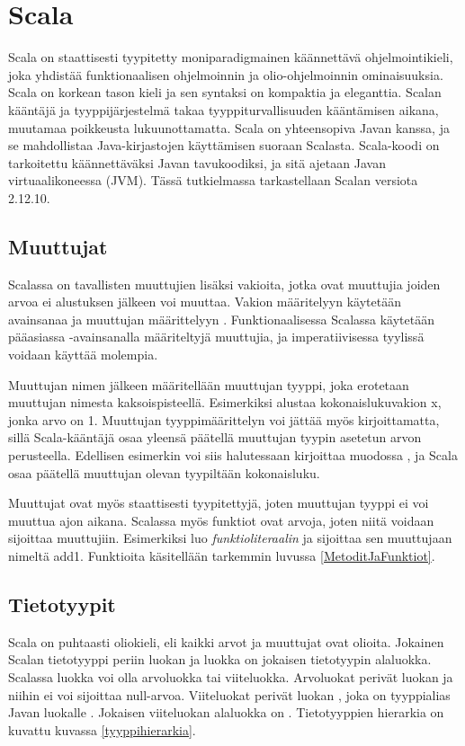 \chapter{Scala} \label{Scala}
Scala on staattisesti tyypitetty moniparadigmainen käännettävä ohjelmointikieli, joka yhdistää funktionaalisen ohjelmoinnin ja olio-ohjelmoinnin ominaisuuksia. Scala on korkean tason kieli ja sen syntaksi on kompaktia ja eleganttia. Scalan kääntäjä ja tyyppijärjestelmä takaa tyyppiturvallisuuden kääntämisen aikana, muutamaa poikkeusta lukuunottamatta. Scala on yhteensopiva Javan kanssa, ja se mahdollistaa Java-kirjastojen käyttämisen suoraan Scalasta. Scala-koodi on tarkoitettu käännettäväksi Javan tavukoodiksi, ja sitä ajetaan Javan virtuaalikoneessa (JVM). Tässä tutkielmassa tarkastellaan Scalan versiota 2.12.10.
\cite[Introduction]{tourOfScala}
\cite[Luku 2]{prorgrammingInScala3rd}


\section{Muuttujat} \label{Muuttujat}
Scalassa on tavallisten muuttujien lisäksi vakioita, jotka ovat muuttujia joiden arvoa ei alustuksen jälkeen voi muuttaa. Vakion määritelyyn käytetään avainsanaa  ja muuttujan määrittelyyn . Funktionaalisessa Scalassa käytetään pääasiassa -avainsanalla määriteltyjä muuttujia, ja imperatiivisessa tyylissä voidaan käyttää molempia.

Muuttujan nimen jälkeen määritellään muuttujan tyyppi, joka erotetaan muuttujan nimesta kaksoispisteellä. Esimerkiksi  alustaa kokonaislukuvakion x, jonka arvo on 1. Muuttujan tyyppimäärittelyn voi jättää myös kirjoittamatta, sillä Scala-kääntäjä osaa yleensä päätellä muuttujan tyypin asetetun arvon perusteella. Edellisen esimerkin voi siis halutessaan kirjoittaa muodossa , ja Scala osaa päätellä muuttujan olevan tyypiltään kokonaisluku.
\cite[Basics]{tourOfScala}

Muuttujat ovat myös staattisesti tyypitettyjä, joten muuttujan tyyppi ei voi muuttua ajon aikana. Scalassa myös funktiot ovat arvoja, joten niitä voidaan sijoittaa muuttujiin. Esimerkiksi  luo \textit{funktioliteraalin} ja sijoittaa sen muuttujaan nimeltä add1. Funktioita käsitellään tarkemmin luvussa \ref{MetoditJaFunktiot}.
\cite[Luku 1]{prorgrammingInScala3rd}


\section{Tietotyypit}
Scala on puhtaasti oliokieli, eli kaikki arvot ja muuttujat ovat olioita. Jokainen Scalan tietotyyppi periin luokan  ja luokka  on jokaisen tietotyypin alaluokka. Scalassa luokka voi olla arvoluokka tai viiteluokka. Arvoluokat perivät luokan  ja niihin ei voi sijoittaa null-arvoa. Viiteluokat perivät luokan , joka on tyyppialias Javan luokalle . Jokaisen viiteluokan alaluokka on . Tietotyyppien hierarkia on kuvattu kuvassa \ref{tyyppihierarkia}.
\cite[Luku 5]{prorgrammingInScala3rd}

